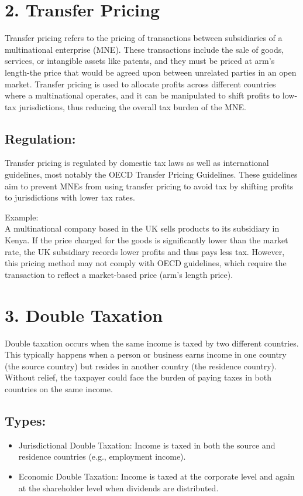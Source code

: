 \documentclass[10pt]{article}
\begin{document}
\section*{2. Transfer Pricing}
\begin{definition}
	Transfer pricing refers to the pricing of transactions between subsidiaries of a multinational enterprise (MNE). These transactions include the sale of goods, services, or intangible assets like patents, and they must be priced at arm's length-the price that would be agreed upon between unrelated parties in an open market. Transfer pricing is used to allocate profits across different countries where a multinational operates, and it can be manipulated to shift profits to low-tax jurisdictions, thus reducing the overall tax burden of the MNE.
\end{definition}


\subsection*{Regulation:}
Transfer pricing is regulated by domestic tax laws as well as international guidelines, most notably the OECD Transfer Pricing Guidelines. These guidelines aim to prevent MNEs from using transfer pricing to avoid tax by shifting profits to jurisdictions with lower tax rates.

Example:\\
A multinational company based in the UK sells products to its subsidiary in Kenya. If the price charged for the goods is significantly lower than the market rate, the UK subsidiary records lower profits and thus pays less tax. However, this pricing method may not comply with OECD guidelines, which require the transaction to reflect a market-based price (arm's length price).

\section*{3. Double Taxation}
Double taxation occurs when the same income is taxed by two different countries. This typically happens when a person or business earns income in one country (the source country) but resides in another country (the residence country). Without relief, the taxpayer could face the burden of paying taxes in both countries on the same income.

\subsection*{Types:}
\begin{itemize}
  \item Jurisdictional Double Taxation: Income is taxed in both the source and residence countries (e.g., employment income).
  \item Economic Double Taxation: Income is taxed at the corporate level and again at the shareholder level when dividends are distributed.
\end{itemize}
\end{document}
